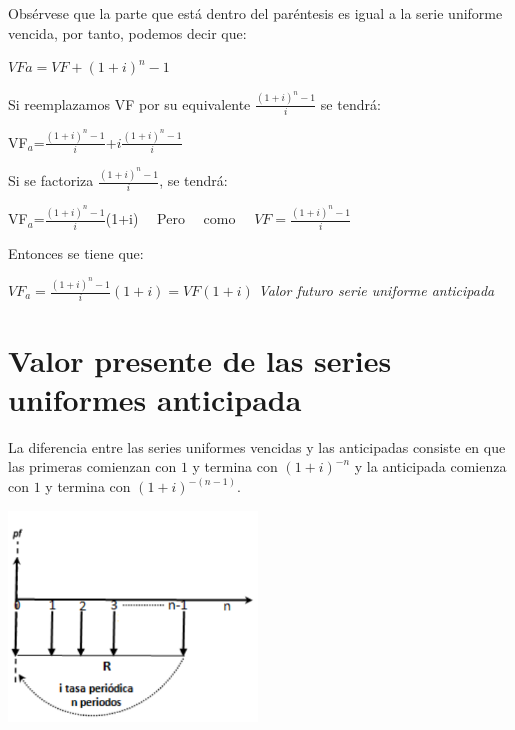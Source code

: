 	Obsérvese que la parte que está dentro del paréntesis es igual a la serie uniforme vencida, por tanto, podemos decir que:

	\vspace{5mm}
$VFa=VF+(1+i)^{n}-1$
	\vspace{5mm}

	Si reemplazamos VF por su equivalente $\frac{(1+i)^{n}-1}{i}$ se tendrá:

	\vspace{5mm}
	VF$_{a}$=$\frac{(1+i)^{n}-1}{i}$+$i\frac{(1+i)^{n}-1}{i}$
	\vspace{5mm}

	Si se factoriza  $\frac{(1+i)^{n}-1}{i}$, se tendrá:

	\vspace{5mm}
	VF$_{a}$=$\frac{(1+i)^{n}-1}{i}$(1+i) \ \  Pero \ \ como \ \ $VF = \frac{(1+i)^{n}-1}{i}$
	\vspace{5mm}

	Entonces se tiene que:

	\vspace{5mm}
$VF_{a}=\frac{(1+i)^{n}-1}{i}(1+i) = VF (1+i)$  \hspace{35pt}\textit{ Valor  futuro  serie  uniforme  anticipada}

	\vspace{5mm}


	


	\section{Valor presente de las series uniformes anticipada}

	La diferencia entre las series uniformes vencidas y las anticipadas consiste en que las primeras comienzan con $1$ y termina con $(1+i)^{-n}$ y la anticipada comienza con $1$ y termina con $(1+i)^{-(n-1)}$.

	\begin{center}
		\includegraphics[height=5.6cm]{4_Capitulo/img/ejemplos/4_18.pdf}
	\end{center}

